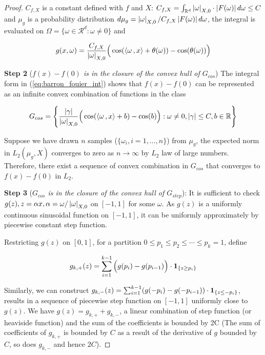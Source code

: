 \begin{proof}
$C_{f,X}$ is a constant defined with $f$ and 
$X$: $C_{f,X} = \int_{\mathbb{R}^d} \left| \omega \right|_{X, 0} \cdot \left| F(\omega) \right| d\omega \leq C$
and $\mu_g$ is a probability distribution
$d\mu_g = \left| \omega \right|_{X,0}/C_{f,X}\left| F(\omega) \right| d\omega$, the integral is evaluated on
$\Omega = \{\omega \in \mathcal{R}^d: \omega \not = 0\}$ and

\begin{equation}
    g(x, \omega) = \frac{C_{f,X}}{\left| \omega \right|_{X, 0}}\Big(\cos(\left\langle \omega\, , x \right\rangle + \theta(\omega)) - \cos(\theta(\omega))\Big)
\end{equation}

\textbf{Step 2} (\textit{$f(x) - f(0)$ is in the closure of the convex hull of $G_{cos}$}) 
The integral form in (\ref{eq:barron_fouier_int}) shows that $f(x) - f(0)$
can be represented as an infinite convex combination of functions in the 
class

\begin{equation}
    G_{cos} = \Bigg\{\frac{\left| \gamma \right|}{\left| \omega \right|_{X, 0}}\Big(\cos(\left\langle \omega\, , x \right\rangle + b) - \cos(b)\Big): \omega \not= 0, \left| \gamma \right| \leq C, b \in \mathbb{R} \Bigg\}
\end{equation}

Suppose we have drawn $n$ samples ($\{\omega_i, i = 1,\dots, n\}$) from $\mu_g$, the 
expected norm in $L_2(\mu_g, X)$ converges to zero as $n \to \infty$ by $L_2$ law 
of large numbers. Therefore, there exist a sequence of convex combination
in $G_{cos}$ that converges to $f(x) - f(0)$ in $L_2$.


\textbf{Step 3} (\textit{$G_{cos}$ is in the closure of the convex hull of $G_{step}$}):
It is sufficient to check $g(z), z = \alpha x, \alpha = \omega/\left| \omega \right|_{X,0}$ on $[-1, 1]$ for some $\omega$. 
As $g(z)$ is a uniformly continuous sinusoidal function on $[-1, 1]$, it can be 
uniformly approximately by piecewise constant step function. 

Restricting $g(z)$ on $[0, 1]$, for a partition 
${0 \leq p_1 \leq p_2 \leq \cdots \leq p_k = 1}$, define

\begin{align}
    g_{k,+}(z) = \sum_{i=1}^{k-1} \Big(g(p_i) - g(p_{i-1})\Big) \cdot
    \mathbf{1}_{\{z\geq p_i\}}
\end{align}

Similarly, we can construct 
$g_{k,-}(z) = \sum_{i=1}^{k-1} (g(-p_i) - g(-p_{i-1})) \cdot \mathbf{1}_{\{z\leq -p_i\}}$,
results in a sequence of piecewise step function on $[-1, 1]$
uniformly close to $g(z)$. We have $g(z) = g_{k,+}+g_{k,-}$, a linear combination
of step function (or heaviside function) and the sum of the coefficients is
bounded by 2C (The sum of coefficients of $g_{k,+}$ is bounded by $C$ as a result of the
derivative of $g$ bounded by $C$, so does $g_{k,-}$ and hence $2C$).


\end{proof}
